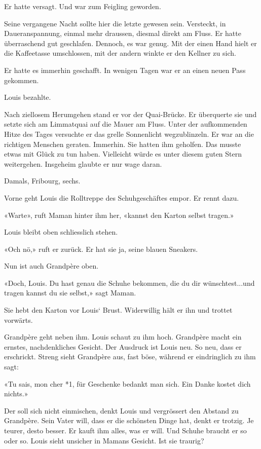 Er hatte versagt. Und war zum Feigling geworden.

Seine vergangene Nacht sollte hier die letzte gewesen sein. Versteckt,
in Daueranspannung, einmal mehr draussen, diesmal direkt am Fluss. Er
hatte überraschend gut geschlafen. Dennoch, es war genug. Mit der einen
Hand hielt er die Kaffeetasse umschlossen, mit der andern winkte er den
Kellner zu sich.

Er hatte es immerhin geschafft. In wenigen Tagen war er an einen neuen
Pass gekommen.

Louis bezahlte.

Nach ziellosem Herumgehen stand er vor der Quai-Brücke. Er überquerte
sie und setzte sich am Limmatquai auf die Mauer am Fluss. Unter der
aufkommenden Hitze des Tages versuchte er das grelle Sonnenlicht
wegzublinzeln. Er war an die richtigen Menschen geraten. Immerhin. Sie
hatten ihm geholfen. Das musste etwas mit Glück zu tun haben. Vielleicht
würde es unter diesem guten Stern weitergehen. Insgeheim glaubte er nur
wage daran.

Damals, Fribourg, sechs.

Vorne geht Louis die Rolltreppe des Schuhgeschäftes empor. Er rennt
dazu.

«Warte», ruft Maman hinter ihm her, «kannst den Karton selbst tragen.»

Louis bleibt oben schliesslich stehen.

«Och nö,» ruft er zurück. Er hat sie ja, seine blauen Sneakers.

Nun ist auch Grandpère oben.

«Doch, Louis. Du hast genau die Schuhe bekommen, die du dir
wünschtest...und tragen kannst du sie selbst,» sagt Maman.

Sie hebt den Karton vor Louis` Brust. Widerwillig hält er ihn und
trottet vorwärts.

Grandpère geht neben ihm. Louis schaut zu ihm hoch. Grandpère macht ein
ernstes, nachdenkliches Gesicht. Der Ausdruck ist Louis neu. So neu,
dass er erschrickt. Streng sieht Grandpère aus, fast böse, während er
eindringlich zu ihm sagt:

«Tu sais, mon cher *1, für Geschenke bedankt man sich. Ein Danke kostet
dich nichts.»

Der soll sich nicht einmischen, denkt Louis und vergrössert den Abstand
zu Grandpère. Sein Vater will, dass er die schönsten Dinge hat, denkt er
trotzig. Je teurer, desto besser. Er kauft ihm alles, was er will. Und
Schuhe braucht er so oder so. Louis sieht unsicher in Mamans Gesicht.
Ist sie traurig?

